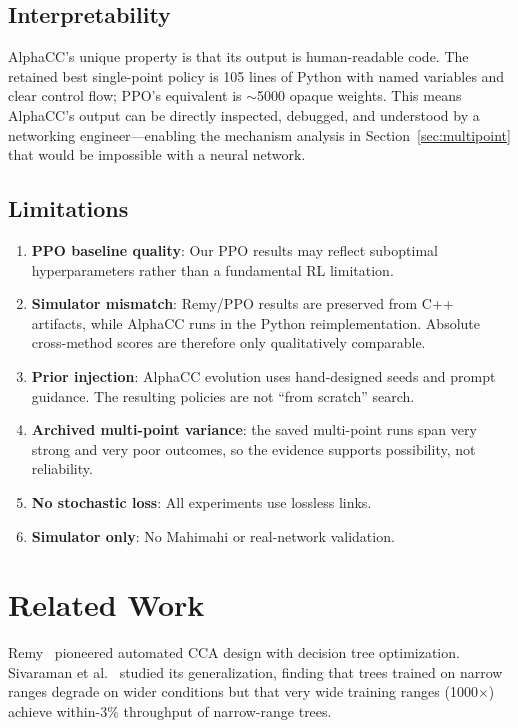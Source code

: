 \subsection{Interpretability}

AlphaCC's unique property is that its output is human-readable code.
The retained best single-point policy is 105 lines of Python with named
variables and clear
control flow; PPO's equivalent is ${\sim}$5000 opaque weights. This means
AlphaCC's output can be directly inspected, debugged, and understood by a
networking engineer---enabling the mechanism analysis in
Section~\ref{sec:multipoint} that would be impossible with a neural network.

\subsection{Limitations}

\begin{enumerate}
\item \textbf{PPO baseline quality}: Our PPO results may reflect suboptimal
  hyperparameters rather than a fundamental RL limitation.
\item \textbf{Simulator mismatch}: Remy/PPO results are preserved from C++
  artifacts, while AlphaCC runs in the Python reimplementation. Absolute
  cross-method scores are therefore only qualitatively comparable.
\item \textbf{Prior injection}: AlphaCC evolution uses hand-designed seeds and
  prompt guidance. The resulting policies are not ``from scratch'' search.
\item \textbf{Archived multi-point variance}: the saved multi-point runs span
  very strong and very poor outcomes, so the evidence supports possibility, not
  reliability.
\item \textbf{No stochastic loss}: All experiments use lossless links.
\item \textbf{Simulator only}: No Mahimahi or real-network validation.
\end{enumerate}


\section{Related Work}

Remy~\cite{winstein2013tcp} pioneered automated CCA design with decision tree
optimization. Sivaraman et al.~\cite{sivaraman2014experimental} studied its
generalization, finding that trees trained on narrow ranges degrade on wider
conditions but that very wide training ranges (1000$\times$) achieve
within-3\% throughput of narrow-range trees.

